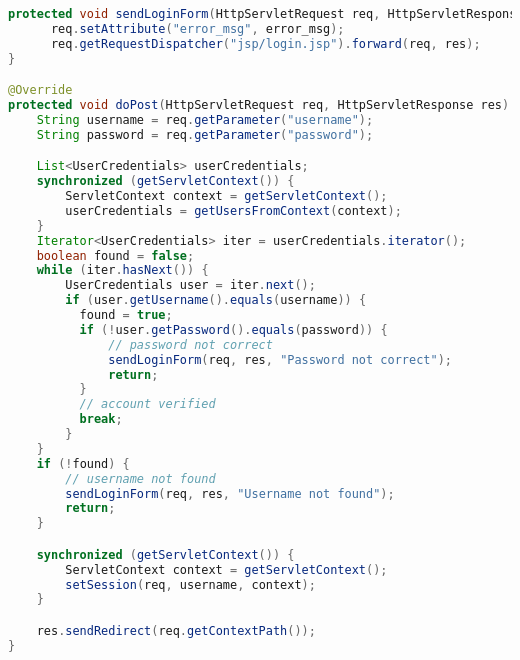 \begin{lstlisting}[language=java, caption={POST method for login page}]
protected void sendLoginForm(HttpServletRequest req, HttpServletResponse res, String error_msg) throws IOException, ServletException {
      req.setAttribute("error_msg", error_msg);
      req.getRequestDispatcher("jsp/login.jsp").forward(req, res);
}

@Override
protected void doPost(HttpServletRequest req, HttpServletResponse res) throws IOException, ServletException {
    String username = req.getParameter("username");
    String password = req.getParameter("password");

    List<UserCredentials> userCredentials;
    synchronized (getServletContext()) {
        ServletContext context = getServletContext();
        userCredentials = getUsersFromContext(context);
    }
    Iterator<UserCredentials> iter = userCredentials.iterator();
    boolean found = false;
    while (iter.hasNext()) {
        UserCredentials user = iter.next();
        if (user.getUsername().equals(username)) {
          found = true;
          if (!user.getPassword().equals(password)) {
              // password not correct
              sendLoginForm(req, res, "Password not correct");
              return;
          }
          // account verified
          break;
        }
    }
    if (!found) {
        // username not found
        sendLoginForm(req, res, "Username not found");
        return;
    }

    synchronized (getServletContext()) {
        ServletContext context = getServletContext();
        setSession(req, username, context);
    }

    res.sendRedirect(req.getContextPath());
}
\end{lstlisting}